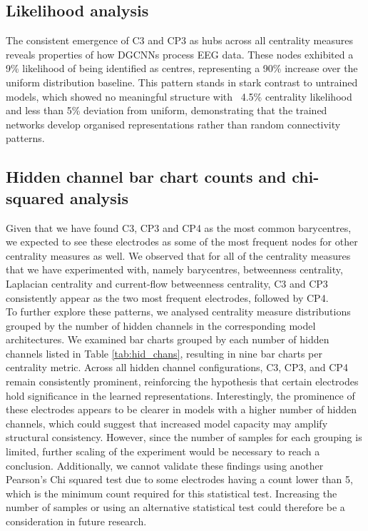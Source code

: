 \subsection{Likelihood analysis}
The consistent emergence of C3 and CP3 as hubs across all centrality measures reveals properties of how DGCNNs process EEG data. These nodes exhibited a 9\% likelihood of being identified as centres, representing a 90\% increase over the uniform distribution baseline. This pattern stands in stark contrast to untrained models, which showed no meaningful structure with ~4.5\% centrality likelihood and less than 5\% deviation from uniform, demonstrating that the trained networks develop organised representations rather than random connectivity patterns. 

\subsection{Hidden channel bar chart counts and chi-squared analysis}
Given that we have found C3, CP3 and CP4 as the most common barycentres, we expected to see these electrodes as some of the most frequent nodes for other centrality measures as well.
We observed that for all of the centrality measures that we have experimented with, namely barycentres, betweenness centrality, Laplacian centrality and current-flow betweenness centrality, C3 and CP3 consistently appear as the two most frequent electrodes, followed by CP4.
\vspace{0.5em}\\
To further explore these patterns, we analysed centrality measure distributions grouped by the number of hidden channels in the corresponding model architectures. We examined bar charts grouped by each number of hidden channels listed in Table \ref{tab:hid_chans}, resulting in nine bar charts per centrality metric. Across all hidden channel configurations, C3, CP3, and CP4 remain consistently prominent, reinforcing the hypothesis that certain electrodes hold significance in the learned representations. Interestingly, the prominence of these electrodes appears to be clearer in models with a higher number of hidden channels, which could suggest that increased model capacity may amplify structural consistency. However, since the number of samples for each grouping is limited, further scaling of the experiment would be necessary to reach a conclusion. Additionally, we cannot validate these findings using another Pearson's Chi squared test due to some electrodes having a count lower than 5, which is the minimum count required for this statistical test. Increasing the number of samples or using an alternative statistical test could therefore be a consideration in future research.


